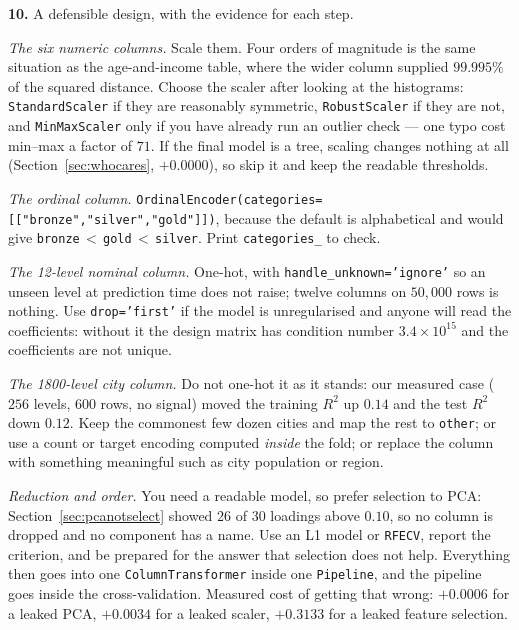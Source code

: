 \documentclass[11pt]{article}
\begin{document}
\medskip
\textbf{10.} A defensible design, with the evidence for each step.

\emph{The six numeric columns.} Scale them. Four orders of magnitude is the
same situation as the age-and-income table, where the wider column supplied
$99.995\%$ of the squared distance. Choose the scaler after looking at the
histograms: \texttt{StandardScaler} if they are reasonably symmetric,
\texttt{RobustScaler} if they are not, and \texttt{MinMaxScaler} only if you
have already run an outlier check --- one typo cost min--max a factor of $71$.
If the final model is a tree, scaling changes nothing at all
(Section~\ref{sec:whocares}, $+0.0000$), so skip it and keep the readable
thresholds.

\emph{The ordinal column.}
\texttt{OrdinalEncoder(categories=[["bronze","silver","gold"]])}, because the
default is alphabetical and would give
\texttt{bronze}$\,<\,$\texttt{gold}$\,<\,$\texttt{silver}. Print
\texttt{categories\_} to check.

\emph{The 12-level nominal column.} One-hot, with
\texttt{handle\_unknown='ignore'} so an unseen level at prediction time does
not raise; twelve columns on $50{,}000$ rows is nothing. Use
\texttt{drop='first'} if the model is unregularised and anyone will read the
coefficients: without it the design matrix has condition number
$3.4\times 10^{15}$ and the coefficients are not unique.

\emph{The 1800-level city column.} Do not one-hot it as it stands: our measured
case ($256$ levels, $600$ rows, no signal) moved the training $R^2$ up $0.14$
and the test $R^2$ down $0.12$. Keep the commonest few dozen cities and map the
rest to \texttt{other}; or use a count or target encoding computed
\emph{inside} the fold; or replace the column with something meaningful such as
city population or region.

\emph{Reduction and order.} You need a readable model, so prefer selection to
PCA: Section~\ref{sec:pcanotselect} showed $26$ of $30$ loadings above $0.10$,
so no column is dropped and no component has a name. Use an L1 model or
\texttt{RFECV}, report the criterion, and be prepared for the answer that
selection does not help. Everything then goes into one
\texttt{ColumnTransformer} inside one \texttt{Pipeline}, and the pipeline goes
inside the cross-validation. Measured cost of getting that wrong: $+0.0006$ for
a leaked PCA, $+0.0034$ for a leaked scaler, $\mathbf{+0.3133}$ for a leaked
feature selection.

\end{document}
